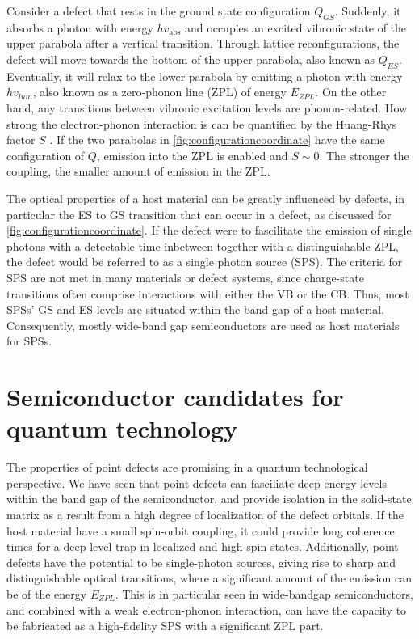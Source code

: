 Consider a defect that rests in the ground state configuration $Q_{GS}$. Suddenly, it absorbs a photon with energy $h v_{\text{abs}}$ and occupies an excited vibronic state of the upper parabola after a vertical transition. Through lattice reconfigurations, the defect will move towards the bottom of the upper parabola, also known as $Q_{ES}$. Eventually, it will relax to the lower parabola by emitting a photon with energy $h v_{lum}$, also known as a zero-phonon line (ZPL) of energy $E_{ZPL}$. On the other hand, any transitions between vibronic excitation levels are phonon-related. How strong the electron-phonon interaction is can be quantified by the Huang-Rhys factor $S$ \cite{Huang1950}. If the two parabolas in \autoref{fig:configurationcoordinate} have the same configuration of $Q$, emission into the ZPL is enabled and $S\sim 0$. The stronger the coupling, the smaller amount of emission in the ZPL.

The optical properties of a host material can be greatly influenced by defects, in particular the ES to GS transition that can occur in a defect, as discussed for \autoref{fig:configurationcoordinate}. If the defect were to fascilitate the emission of single photons with a detectable time inbetween together with a distinguishable ZPL, the defect would be referred to as a single photon source (SPS). The criteria for SPS are not met in many materials or defect systems, since charge-state transitions often comprise interactions with either the VB or the CB. Thus, most SPSs' GS and ES levels are situated within the band gap of a host material. Consequently, mostly wide-band gap semiconductors are used as host materials for SPSs.

\section{Semiconductor candidates for quantum technology}

The properties of point defects are promising in a quantum technological perspective. We have seen that point defects can fasciliate deep energy levels within the band gap of the semiconductor, and provide isolation in the solid-state matrix as a result from a high degree of localization of the defect orbitals. If the host material have a small spin-orbit coupling, it could provide long coherence times for a deep level trap in localized and high-spin states. Additionally, point defects have the potential to be single-photon sources, giving rise to sharp and distinguishable optical transitions, where a significant amount of the emission can be of the energy $E_{ZPL}$. This is in particular seen in wide-bandgap semiconductors, and combined with a weak electron-phonon interaction, can have the capacity to be fabricated as a high-fidelity SPS with a significant ZPL part.


